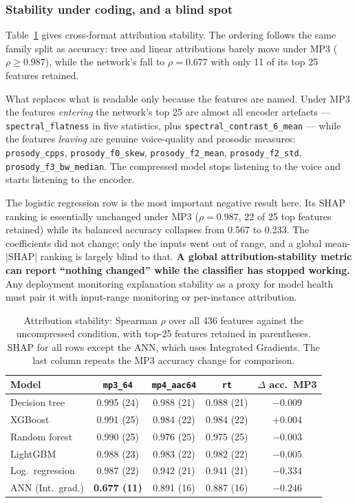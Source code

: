 \documentclass[a4paper,9pt,twocolumn]{extarticle}
\newcommand{\ft}[1]{\texttt{\footnotesize #1}}
\newcommand{\scsix}{\ft{spectral\_contrast\_6\_mean}}
\begin{document}
\subsubsection{Stability under coding, and a blind spot}
Table~\ref{tab:stab} gives cross-format attribution stability. The ordering
follows the same family split as accuracy: tree and linear attributions barely
move under MP3 ($\rho\geq0.987$), while the network's fall to $\rho=0.677$ with
only 11 of its top 25 features retained.

What replaces what is readable only because the features are named. Under MP3
the features \emph{entering} the network's top 25 are almost all encoder
artefacts --- \ft{spectral\_flatness} in five statistics, plus \scsix{} ---
while the features \emph{leaving} are genuine voice-quality and prosodic
measures: \ft{prosody\_cpps}, \ft{prosody\_f0\_skew}, \ft{prosody\_f2\_mean},
\ft{prosody\_f2\_std}, \ft{prosody\_f3\_bw\_median}. The compressed model stops
listening to the voice and starts listening to the encoder.

The logistic regression row is the most important negative result here. Its
SHAP ranking is essentially unchanged under MP3 ($\rho=0.987$, 22 of 25 top
features retained) while its balanced accuracy collapses from 0.567 to 0.233.
The coefficients did not change; only the inputs went out of range, and a
global mean-$|$SHAP$|$ ranking is largely blind to that. \textbf{A global
attribution-stability metric can report ``nothing changed'' while the
classifier has stopped working.} Any deployment monitoring explanation
stability as a proxy for model health must pair it with input-range monitoring
or per-instance attribution.

\begin{table}[!t]
\caption{Attribution stability: Spearman $\rho$ over all 436 features against
the uncompressed condition, with top-25 features retained in parentheses. SHAP
for all rows except the ANN, which uses Integrated Gradients. The last column
repeats the MP3 accuracy change for comparison.}
\label{tab:stab}
\centering
\scriptsize
\setlength{\tabcolsep}{4pt}
\begin{tabular}{@{}lcccc@{}}
\toprule
Model & \ft{mp3\_64} & \ft{mp4\_aac64} & \ft{rt} & $\Delta$ acc.\ MP3 \\
\midrule
Decision tree       & 0.995 (24) & 0.988 (21) & 0.988 (21) & $-0.009$ \\
XGBoost             & 0.991 (25) & 0.984 (22) & 0.984 (22) & $+0.004$ \\
Random forest       & 0.990 (25) & 0.976 (25) & 0.975 (25) & $-0.003$ \\
LightGBM            & 0.988 (23) & 0.983 (22) & 0.982 (22) & $-0.005$ \\
Log.\ regression    & 0.987 (22) & 0.942 (21) & 0.941 (21) & $\mathbf{-0.334}$ \\
ANN (Int.\ grad.)   & \textbf{0.677 (11)} & 0.891 (16) & 0.887 (16) & $-0.246$ \\
\bottomrule
\end{tabular}
\end{table}
\end{document}
